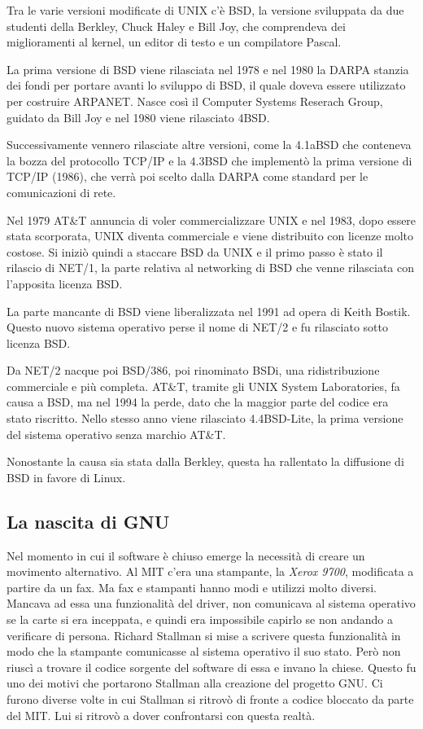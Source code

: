 Tra le varie versioni modificate di UNIX c'è BSD, la versione sviluppata da due studenti della Berkley, Chuck Haley e Bill Joy, che comprendeva dei miglioramenti al kernel, un editor di testo e un compilatore Pascal. 

La prima versione di BSD viene rilasciata nel 1978  e nel 1980 la DARPA stanzia dei fondi per portare avanti lo sviluppo di BSD, il quale doveva essere utilizzato per costruire ARPANET. 
Nasce così il Computer Systems Reserach Group, guidato da Bill Joy e nel 1980 viene rilasciato 4BSD.

Successivamente vennero rilasciate altre versioni, come la 4.1aBSD che conteneva la bozza del protocollo TCP/IP e la 4.3BSD che implementò la prima versione di TCP/IP (1986), che verrà poi scelto dalla DARPA come standard per le comunicazioni di rete. 

Nel 1979 AT\&T annuncia di voler commercializzare UNIX e nel 1983, dopo essere stata scorporata, UNIX diventa commerciale e viene distribuito con licenze molto costose. Si iniziò quindi a staccare BSD da UNIX e il primo passo è stato il rilascio di NET/1, la parte relativa al networking di BSD che venne rilasciata con l'apposita licenza BSD.

La parte mancante di BSD viene liberalizzata nel 1991 ad opera di Keith Bostik. Questo nuovo sistema operativo perse il nome di NET/2 e fu rilasciato sotto licenza BSD.

Da NET/2 nacque poi BSD/386, poi rinominato BSDi, una ridistribuzione commerciale e più completa.
AT\&T, tramite gli UNIX System Laboratories, fa causa a BSD, ma nel 1994 la perde, dato che la maggior parte del codice era stato riscritto. Nello stesso anno viene rilasciato 4.4BSD-Lite, la prima versione del sistema operativo senza marchio AT\&T.

Nonostante la causa sia stata dalla Berkley, questa ha rallentato la diffusione di BSD in favore di Linux.

\subsection{La nascita di GNU}

Nel momento in cui il software è chiuso emerge la necessità di creare un movimento alternativo. Al MIT c'era una stampante, la \textit{Xerox 9700}, modificata a partire da un fax. Ma fax e stampanti hanno modi e utilizzi molto diversi. Mancava ad essa una funzionalità del driver, non comunicava al sistema operativo se la carte si era inceppata, e quindi era impossibile capirlo se non andando a verificare di persona. Richard Stallman si mise a scrivere questa funzionalità in modo che la stampante comunicasse al sistema operativo il suo stato. Però non riuscì a trovare il codice sorgente del software di essa e invano la chiese. Questo fu uno dei motivi che portarono Stallman alla creazione del progetto GNU. Ci furono diverse volte in cui Stallman si ritrovò di fronte a codice bloccato da parte del MIT. Lui si ritrovò a dover confrontarsi con questa realtà.

